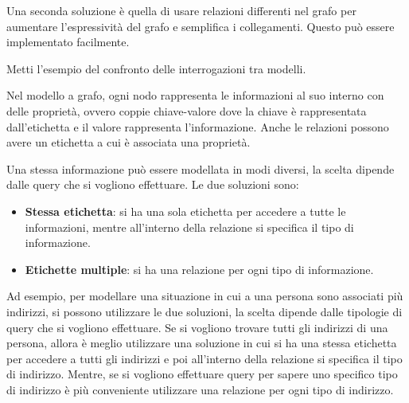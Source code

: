 Una seconda soluzione è quella di usare relazioni differenti nel grafo per aumentare
l'espressività del grafo e semplifica i collegamenti. Questo può essere implementato
facilmente.

\begin{esempio}
      Metti l'esempio del confronto delle interrogazioni tra modelli.
\end{esempio}

Nel modello a grafo, ogni nodo rappresenta le informazioni al suo interno con 
delle proprietà, ovvero coppie chiave-valore dove la chiave è rappresentata 
dall'etichetta e il valore rappresenta l'informazione. Anche le relazioni possono
avere un etichetta a cui è associata una proprietà.

Una stessa informazione può essere modellata in modi diversi, la scelta dipende
dalle query che si vogliono effettuare. Le due soluzioni sono:
\begin{itemize}
      \item \textbf{Stessa etichetta}: si ha una sola etichetta per accedere
            a tutte le informazioni, mentre all'interno della relazione si specifica
            il tipo di informazione.
      \item \textbf{Etichette multiple}: si ha una relazione per ogni tipo di
            informazione.
\end{itemize}
Ad esempio, per modellare una situazione in cui a una persona sono associati più
indirizzi, si possono utilizzare le due soluzioni, la scelta dipende dalle 
tipologie di query che si vogliono effettuare. Se si vogliono trovare tutti 
gli indirizzi di una persona, allora è meglio utilizzare una soluzione in cui 
si ha una stessa etichetta per accedere a tutti gli indirizzi e poi all'interno 
della relazione si specifica il tipo di indirizzo. Mentre, se si vogliono 
effettuare query per sapere uno specifico tipo di indirizzo è più conveniente
utilizzare una relazione per ogni tipo di indirizzo. 


